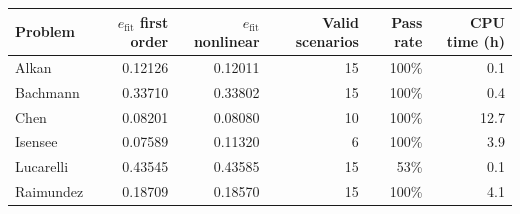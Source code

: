 \begin{tabular}{@{}lrrrrr@{}}
\toprule
Problem & $e_{\mathrm{fit}}$ first order & $e_{\mathrm{fit}}$ nonlinear & Valid scenarios & Pass rate & CPU time (h) \\
\midrule
Alkan & 0.12126 & 0.12011 & 15 & 100\% & 0.1 \\
Bachmann & 0.33710 & 0.33802 & 15 & 100\% & 0.4 \\
Chen & 0.08201 & 0.08080 & 10 & 100\% & 12.7 \\
Isensee & 0.07589 & 0.11320 & 6 & 100\% & 3.9 \\
Lucarelli & 0.43545 & 0.43585 & 15 & 53\% & 0.1 \\
Raimundez & 0.18709 & 0.18570 & 15 & 100\% & 4.1 \\
\bottomrule
\end{tabular}
